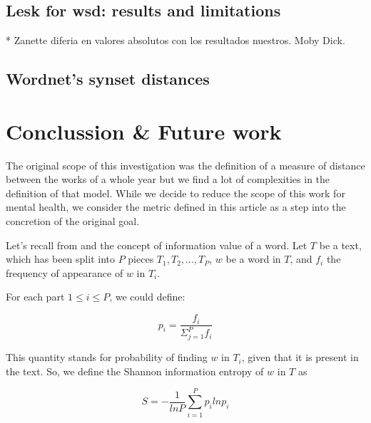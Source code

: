 \documentclass{pnastwo}
\begin{document}
\begin{article}
\subsection{Lesk for wsd: results and limitations}
* Zanette diferia en valores absolutos con los resultados nuestros. Moby Dick. 

\subsection{Wordnet's synset distances}

\section{Conclussion \& Future work}
The original scope of this investigation was the definition of a measure of distance between the works of a whole year but we find a lot of complexities in the definition of that model. While we decide to reduce the scope of this work for mental health, we consider the metric defined in this article as a step into the concretion of the original goal.

% 
% 
% 
% 
% 

\label{appendix1}
Let's recall from \cite{DARWIN} and \cite{ENTROPIC} the concept of information value of a word.
Let $T$ be a text, which has been split into $P$ pieces $T_1, T_2, \dots, T_P$, $w$ be a word in $T$,
and $f_i$ the frequency of appearance of $w$ in $T_i$.

For each part $1 \leq i \leq P$, we could define:

\begin{equation}
  p_i = \frac{f_i}{\Sigma_{j=1}^{P}f_i}
\end{equation}

This quantity stands for probability of finding $w$ in $T_i$, given that it is present in the text. So, 
we define the Shannon information entropy of $w$ in $T$ as

\begin{equation}
  S = -\frac{1}{ln P}\sum_{i=1}^{P}p_i ln p_i
\end{equation}




\end{article}
\end{document}
